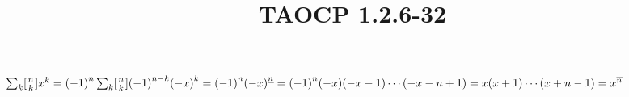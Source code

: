 \documentclass{article}
\title{TAOCP 1.2.6\mbox{-}32}
\begin{document}
\maketitle

\( \sum_{k} [{n \atop k}]x^{k} = {(-1)}^{n}\sum_{k} [{n \atop k}]{(-1)}^{n-k}{(-x)}^{k} = {(-1)}^{n}{(-x)}^{\underline{n}} = {(-1)}^{n}(-x)(-x-1)\cdots(-x-n+1) = x(x+1)\cdots(x+n-1) = x^{\overline{n}} \)
\end{document}
